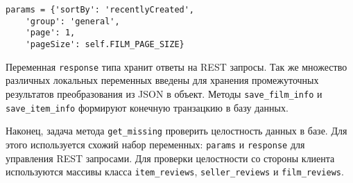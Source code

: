 \medskip
\begin{lstlisting}[style=Python]
  params = {'sortBy': 'recentlyCreated',
    'group': 'general',
    'page': 1,
    'pageSize': self.FILM_PAGE_SIZE}
\end{lstlisting}
\medskip

Переменная \texttt{response} типа хранит ответы на REST запросы. Так же множество различных локальных переменных введены для хранения промежуточных результатов преобразования из JSON в объект. Методы \texttt{save\_fi\-lm\_info} и \texttt{save\_item\_info} формируют конечную транзацкию в базу данных.

Наконец, задача метода \texttt{get\_missing} проверить целостность данных в базе. Для этого используется схожий набор переменных: \texttt{params} и \texttt{response} для управления REST запросами. Для проверки целостности со стороны клиента используются массивы класса \texttt{item\_reviews}, \texttt{seller\_reviews} и \texttt{film\_\-reviews}.
